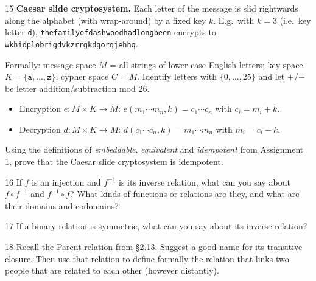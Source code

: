 \begin{exercise}{15}
    \textbf{Caesar slide cryptosystem.} Each letter of the message is slid
    rightwards along the alphabet (with wrap-around) by a fixed key $k$. E.g.\
    with $k=3$ (i.e.\ key letter \texttt{d}),
    \texttt{thefamilyofdashwoodhadlongbeen} encrypts to
    \texttt{wkhidplobrigdvkzrrgkdgorqjehhq}.

    Formally: message space $M$ = all strings of lower-case English letters; key
    space $K=\{\mathtt a,\dots,\mathtt z\}$; cypher space $C=M$. Identify letters
    with $\{0,\dots,25\}$ and let $+$/$-$ be letter addition/subtraction mod 26.
    \begin{itemize}
        \item Encryption $e:M\times K\to M$:
              $e(m_1\cdots m_n,k)=c_1\cdots c_n$ with $c_i=m_i+k$.
        \item Decryption $d:M\times K\to M$:
              $d(c_1\cdots c_n,k)=m_1\cdots m_n$ with $m_i=c_i-k$.
    \end{itemize}
    Using the definitions of \emph{embeddable}, \emph{equivalent} and
    \emph{idempotent} from Assignment 1, prove that the Caesar slide cryptosystem
    is idempotent.
\end{exercise}
\begin{solbox}
\begin{solution}

\end{solution}
\end{solbox}

\begin{exercise}{16}
    If $f$ is an injection and $f^{-1}$ is its inverse relation, what can you say
    about $f\circ f^{-1}$ and $f^{-1}\circ f$? What kinds of functions or
    relations are they, and what are their domains and codomains?
\end{exercise}
\begin{solbox}
\begin{solution}

\end{solution}
\end{solbox}

\begin{exercise}{17}
    If a binary relation is symmetric, what can you say about its inverse
    relation?
\end{exercise}

\begin{exercise}{18}
    Recall the Parent relation from \S2.13. Suggest a good name for its
    transitive closure. Then use that relation to define formally the relation
    that links two people that are related to each other (however distantly).
\end{exercise}
\begin{solbox}
\begin{solution}

\end{solution}
\end{solbox}

